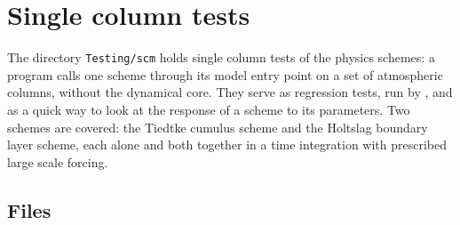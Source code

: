 \chapter{Single column tests}

The directory \verb=Testing/scm= holds single column tests of the physics
schemes: a program calls one scheme through its model entry point on a set
of atmospheric columns, without the dynamical core. They serve as
regression tests, run by , and as a quick way to look at
the response of a scheme to its parameters. Two schemes are covered: the
Tiedtke cumulus scheme and the Holtslag boundary layer scheme, each alone and both together in a time
integration with prescribed large scale forcing.

\section{Files}

